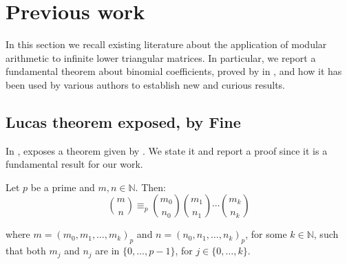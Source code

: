 
\section{Previous work}

In this section we recall existing literature about the application of modular
arithmetic to infinite lower triangular matrices. In particular, we report a
fundamental theorem about binomial coefficients, proved by
\citeauthor{lucas:theorie:des:nombres} in \cite{lucas:theorie:des:nombres}, and
how it has been used by various authors to establish new and curious results.

\subsection{Lucas theorem exposed, by Fine}

In \cite{fine:1947}, \citeauthor{fine:1947} exposes a theorem given by
\citeauthor{lucas:theorie:des:nombres}. We state it and report a proof since
it is a fundamental result for our work. 
\begin{theorem}
    Let $p$ be a prime and $m,n\in\mathbb{N}$. Then:
    \begin{displaymath}
        {{m}\choose{n}} \equiv_{p} 
            {{m_{0}}\choose{n_{0}}} 
            {{m_{1}}\choose{n_{1}}} 
            \cdots 
            {{m_{k}}\choose{n_{k}}} 
    \end{displaymath}
    \label{thm:lucas:theorem}
\end{theorem}
where $m=\left(m_{0},m_{1},\ldots,m_{k}\right)_{p}$ and
$n=\left(n_{0},n_{1},\ldots,n_{k}\right)_{p}$, for some $k\in\mathbb{N}$, such
that both $m_{j}$ and $n_{j}$ are in $\lbrace 0,\ldots, p-1 \rbrace$, for
$j\in\lbrace 0,\ldots,k\rbrace$.

